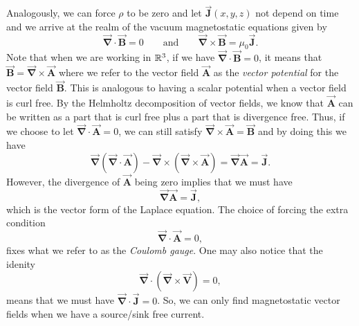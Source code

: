 \documentclass[12pt]{article} %
\newcommand{\grad}{\boldsymbol{\vec{\nabla}}}
\newcommand{\vecfieldB}{\boldsymbol{\vec{B}}}
\newcommand{\vecfieldJ}{\boldsymbol{\vec{J}}}
\newcommand{\veclaplace}{\boldsymbol{\vec{\nabla}}}
\newcommand{\vecfieldV}{\boldsymbol{\vec{V}}}
\newcommand{\vecfieldA}{\boldsymbol{\vec{A}}}
\begin{document}
\begin{solution}
\begin{enumerate}[(a)]
    Analogously, we can force $\rho$ to be zero and let $\vecfieldJ(x,y,z)$ not depend on time and we arrive at the realm of the vacuum magnetostatic equations given by
    \[
        \grad \cdot \vecfieldB = 0 \qquad \textrm{and} \qquad \grad \times \vecfieldB = \mu_0 \vecfieldJ.
    \]
    Note that when we are working in $\mathbb{R}^3$, if we have $\grad \cdot \vecfieldB=0$, it means that $\vecfieldB = \grad \times \vecfieldA$ where we refer to the vector field $\vecfieldA$ as the \emph{vector potential} for the vector field $\vecfieldB$.  This is analogous to having a scalar potential when a vector field is curl free. By the Helmholtz decomposition of vector fields, we know that $\vecfieldA$ can be written as a part that is curl free plus a part that is divergence free. Thus, if we choose to let $\grad \cdot \vecfieldA=0$, we can still satisfy $\grad \times \vecfieldA = \vecfieldB$ and by doing this we have
    \[
    \grad \left(\grad \cdot \vecfieldA\right) - \grad \times \left(\grad \times \vecfieldA\right)= \veclaplace \vecfieldA = \vecfieldJ.
    \]
    However, the divergence of $\vecfieldA$ being zero implies that we must have
    \[
    \veclaplace \vecfieldA = \vecfieldJ,
    \]
    which is the vector form of the Laplace equation.  The choice of forcing the extra condition
    \[
    \grad \cdot \vecfieldA=0,
    \]
    fixes what we refer to as the \emph{Coulomb gauge}.  One may also notice that the idenity
    \[
    \grad \cdot \left( \grad \times \vecfieldV \right) = 0,
    \]
    means that we must have $\grad \cdot \vecfieldJ=0$.  So, we can only find magnetostatic vector fields when we have a source/sink free current.
    

\end{enumerate}
\end{solution}
\end{document}
